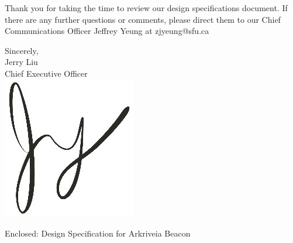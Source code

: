 \documentclass[11pt]{letter}
\begin{document}
\begin{letter}
\medskip
Thank you for taking the time to review our design specifications document. If there are any further questions or comments, please direct them to our Chief Communications Officer Jeffrey Yeung at zjyeung@sfu.ca
 
\medskip
Sincerely,\\
Jerry Liu\\
Chief Executive Officer\\

\vspace*{-0.25cm}
\includegraphics[scale=0.8]{./images/signature.jpg}

{Enclosed: Design Specification for Arkriveia Beacon}

\end{letter}
\end{document}
